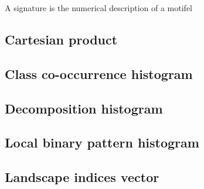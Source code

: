 A signature is the numerical description of a motifel

\subsection{Cartesian product}

\subsection{Class co-occurrence histogram}

\subsection{Decomposition histogram}

\subsection{Local binary pattern histogram}

\subsection{Landscape indices vector}
